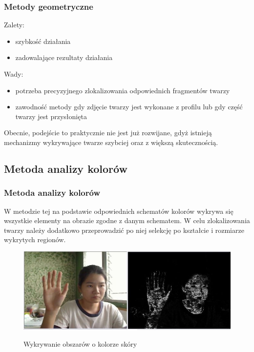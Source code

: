\documentclass[xcolor=table]{beamer}
\begin{document}
\begin{frame}
  \frametitle{Metody geometryczne}
 
Zalety:
\begin{itemize}
\item szybkość działania
\item zadowalające rezultaty działania
\end{itemize}

\vspace{10pt}
 {
Wady:
\begin{itemize}
\item potrzeba precyzyjnego zlokalizowania odpowiednich fragmentów twarzy
\item zawodność metody gdy zdjęcie twarzy jest wykonane z profilu lub gdy część twarzy jest przysłonięta
\end{itemize}}

\vspace{10pt}
 {
Obecnie, podejście to praktycznie nie jest już rozwijane, gdyż istnieją mechanizmy wykrywające twarze szybciej oraz z większą skutecznością.}

\end{frame}

\subsection{Metoda analizy kolorów}
\begin{frame}
  \frametitle{Metoda analizy kolorów}

W metodzie tej na podstawie odpowiednich schematów kolorów wykrywa się wszystkie elementy na obrazie zgodne z danym schematem. W celu zlokalizowania twarzy należy dodatkowo przeprowadzić po niej selekcję po kształcie i rozmiarze wykrytych regionów.

\begin{figure}
  {\includegraphics[scale=0.4]{skin_detection.jpg}}
\caption{Wykrywanie obszarów o kolorze skóry}
\end{figure}

\end{frame}
\end{document}
